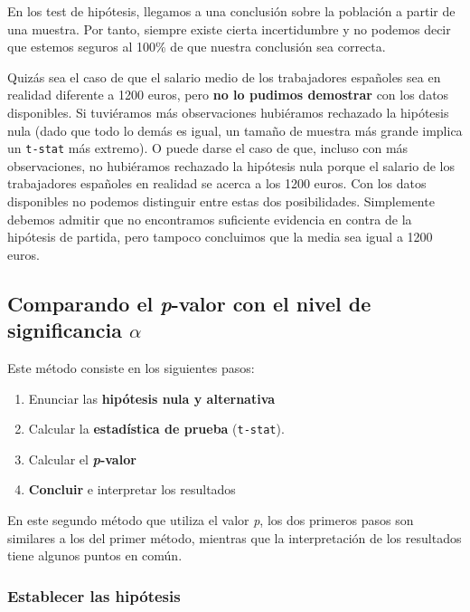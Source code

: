 \documentclass[
]{book}
\providecommand{\tightlist}{%
  \setlength{\itemsep}{0pt}\setlength{\parskip}{0pt}}
\begin{document}
En los test de hipótesis, llegamos a una conclusión sobre la población a partir de una muestra. Por tanto, siempre existe cierta incertidumbre y no podemos decir que estemos seguros al 100\% de que nuestra conclusión sea correcta.

Quizás sea el caso de que el salario medio de los trabajadores españoles sea en realidad diferente a 1200 euros, pero \textbf{no lo pudimos demostrar} con los datos disponibles. Si tuviéramos más observaciones hubiéramos rechazado la hipótesis nula (dado que todo lo demás es igual, un tamaño de muestra más grande implica un \texttt{t-stat} más extremo). O puede darse el caso de que, incluso con más observaciones, no hubiéramos rechazado la hipótesis nula porque el salario de los trabajadores españoles en realidad se acerca a los 1200 euros. Con los datos disponibles no podemos distinguir entre estas dos posibilidades. Simplemente debemos admitir que no encontramos suficiente evidencia en contra de la hipótesis de partida, pero tampoco concluimos que la media sea igual a 1200 euros.

\hypertarget{comparando-el-p-valor-con-el-nivel-de-significancia-alpha}{%
\subsection{\texorpdfstring{Comparando el \emph{p}-valor con el nivel de significancia \(\alpha\)}{Comparando el p-valor con el nivel de significancia \textbackslash alpha}}\label{comparando-el-p-valor-con-el-nivel-de-significancia-alpha}}

Este método consiste en los siguientes pasos:

\begin{enumerate}
\def\labelenumi{\arabic{enumi}.}
\tightlist
\item
  Enunciar las \textbf{hipótesis nula y alternativa}
\item
  Calcular la \textbf{estadística de prueba} (\texttt{t-stat}).
\item
  Calcular el \textbf{\emph{p}-valor}
\item
  \textbf{Concluir} e interpretar los resultados
\end{enumerate}

En este segundo método que utiliza el valor \emph{p}, los dos primeros pasos son similares a los del primer método, mientras que la interpretación de los resultados tiene algunos puntos en común.

\hypertarget{establecer-las-hipuxf3tesis}{%
\subsubsection{Establecer las hipótesis}\label{establecer-las-hipuxf3tesis}}
\end{document}
